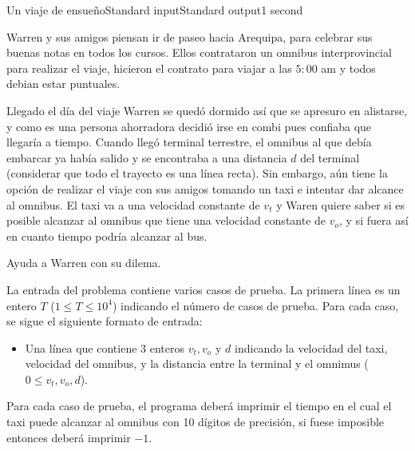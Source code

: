 \begin{problem}{Un viaje de ensue\~no}{Standard input}{Standard output}{1 second}{}

       
Warren y sus amigos piensan ir de paseo hacia Arequipa, para celebrar sus buenas notas en todos los cursos. Ellos contrataron un omnibus interprovincial para realizar el viaje, hicieron el contrato para viajar a las $5:00$ am y todos debian estar puntuales. 

Llegado el día del viaje Warren se quedó dormido así que se apresuro en alistarse, y como es una persona ahorradora decidió irse en combi pues confiaba que llegaría a tiempo. Cuando llegó terminal terrestre, el omnibus al que debía embarcar ya había salido y se encontraba a una distancia $d$ del terminal (considerar que todo el trayecto es una línea recta). Sin embargo, aún tiene la opción de realizar el viaje con sus amigos tomando un taxi e intentar dar alcance al omnibus. El taxi va a una velocidad constante de $v_t$ y Waren quiere saber si es posible alcanzar al omnibus que tiene una velocidad constante de $v_o$, y si fuera así en cuanto tiempo podría alcanzar al bus.

Ayuda a Warren con su dilema.

\InputFile

La entrada del problema contiene varios casos de prueba. La primera línea es un entero $T$ ($1 \leq T \leq 10^4$) indicando el número de casos de prueba. Para cada caso, se sigue el siguiente formato de entrada:

\begin{itemize}
\item Una línea que contiene 3 enteros $v_t, v_o$ y $d$ indicando la velocidad del taxi, velocidad del omnibus, y la distancia entre la terminal y el omnimus ($0 \leq v_t, v_o, d$).

\end{itemize}

\OutputFile
Para cada caso de prueba, el programa deber\'a imprimir el tiempo en el cual el taxi puede alcanzar al omnibus con 10 dígitos de precisión, si fuese imposible entonces deber\'a imprimir $-1$.

\Example

\begin{example}
\end{example}


\end{problem}
